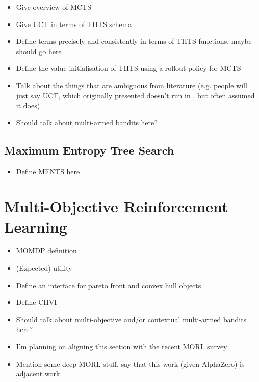         \begin{itemize}
            \item Give overview of MCTS
            \item Give UCT in terms of THTS schema 
            \item Define terms precisely and consistently in terms of THTS functions, maybe \mctsmode\ewe should go here
            \item Define the value initialisation of THTS using a rollout policy for MCTS
            \item Talk about the things that are ambiguous from literature (e.g. people will just say UCT, which originally presented doesn't run in \mctsmode, but often assumed it does)
            \item Should talk about multi-armed bandits here?
        \end{itemize}
    
    \subsection{Maximum Entropy Tree Search}
    \label{sec:2-2-3-ments}
    
        \begin{itemize}
            \item Define MENTS here
        \end{itemize}

\section{Multi-Objective Reinforcement Learning}
\label{sec:2-3-morl}
    
    \begin{itemize}
        \item MOMDP definition
        \item (Expected) utility
        \item Define an interface for pareto front and convex hull objects
        \item Define CHVI
        \item Should talk about multi-objective and/or contextual multi-armed bandits here?
        \item I'm planning on aligning this section with the recent MORL survey \cite{morl_survey}
        \item Mention some deep MORL stuff, say that this work (given AlphaZero) is adjacent work
    \end{itemize}

